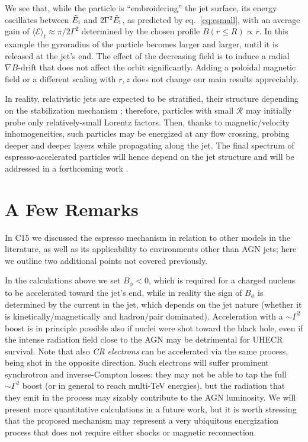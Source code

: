\documentclass[3p,times,twocolumn]{elsarticle}
\begin{document}
We see that, while the particle is ``embroidering'' the jet surface,  its energy oscillates between $\tilde E_{\rm i}$ and $2\Gamma^2\tilde E_{\rm i}$, as predicted by eq.\ \ref{eq:esmall}, with an average gain of $\langle \mathcal E\rangle_t \approx  \pi/2 \Gamma^2$ determined by  the chosen profile $B(r\leq R)\propto r$.
In this example the gyroradius of the particle becomes larger and larger, until it is released at the jet's end.
The effect of the decreasing field is to induce a radial $\nabla B$-drift that does not affect the orbit significantly.
Adding a poloidal magnetic field or a different scaling with $r,z$ does not change our main results appreciably.

In reality, relativistic jets are expected to be stratified, their structure depending on the stabilization mechanism \cite[e.g.,][]{mignone+10,pk15,tb16};
therefore, particles with small $\mathcal R$ may initially probe only relatively-small Lorentz factors.
Then, thanks to magnetic/velocity inhomogeneities, such particles may be energized at any flow crossing, probing deeper and deeper layers while propagating along the jet. 
The final spectrum of espresso-accelerated particles will hence depend on the jet structure and will be addressed in a forthcoming work \cite{jet}.


\section{A Few Remarks}
In C15 we discussed the espresso mechanism in relation to other models in the literature, as well as its applicability to environments other than AGN jets; here we outline two additional points not  covered previously. 

In the calculations above we set $B_{\phi}<0$, which is required for a charged nucleus to be accelerated toward the jet's end, while in reality the sign of $B_{\phi}$ is determined by the current in the jet, which depends on the jet nature (whether it is kinetically/magnetically and hadron/pair dominated).   
Acceleration with a $\sim\Gamma^2$ boost is in principle possible also if nuclei were shot toward the black hole, even if the intense radiation field close to the AGN may be detrimental for UHECR survival. 
Note that also \emph{CR electrons} can be accelerated via the same process, being shot in the opposite direction. 
Such electrons will suffer prominent synchrotron and inverse-Compton losses: they may not be able to tap the full $\sim\Gamma^2$ boost (or in general to reach multi-TeV energies), but the radiation that they emit in the process may sizably contribute to the AGN luminosity.
We will present more quantitative calculations in a future work, but it is worth stressing that the proposed mechanism may represent a very ubiquitous energization process that does not require either shocks or magnetic reconnection. 
\end{document}
